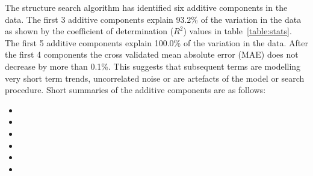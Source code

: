 \documentclass{article} %
\begin{document}
The structure search algorithm has identified six additive components in the data.
The  first 3 additive components explain 93.2\% of the variation in the data as shown by the coefficient of determination ($R^2$) values in table~\ref{table:stats}.
The  first 5 additive components explain 100.0\% of the variation in the data.
After the first 4 components the cross validated mean absolute error (MAE) does not decrease by more than 0.1\%.
This suggests that subsequent terms are modelling very short term trends, uncorrelated noise or are artefacts of the model or search procedure.
Short summaries of the additive components are as follows:
\begin{itemize}

  \item  

  \item  

  \item  

  \item  

  \item  

  \item  

\end{itemize}
\end{document}
